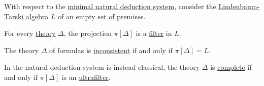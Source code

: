 \begin{proposition}\label{thm:lindenbaum_tarski_theories}
  With respect to the \hyperref[def:propositional_natural_deduction_systems]{minimal natural deduction system}, consider the \hyperref[def:lindenbaum_tarski_algebra]{Lindenbaum-Tarski algebra} \( L \) of an empty set of premises.

  \begin{thmenum}
     For every \hyperref[def:logical_theory]{theory} \( \Delta \), the projection \( \pi[\Delta] \) is a \hyperref[def:lattice_ideal]{filter} in \( L \).

     The theory \( \Delta \) of formulas is \hyperref[def:consistent_set_of_sentences]{inconsistent} if and only if \( \pi[\Delta] = L \).

     In the natural deduction system is instead classical, the theory \( \Delta \) is \hyperref[def:complete_set_of_sentences]{complete} if and only if \( \pi[\Delta] \) is an \hyperref[def:ultrafilter]{ultrafilter}.
  \end{thmenum}
\end{proposition}
